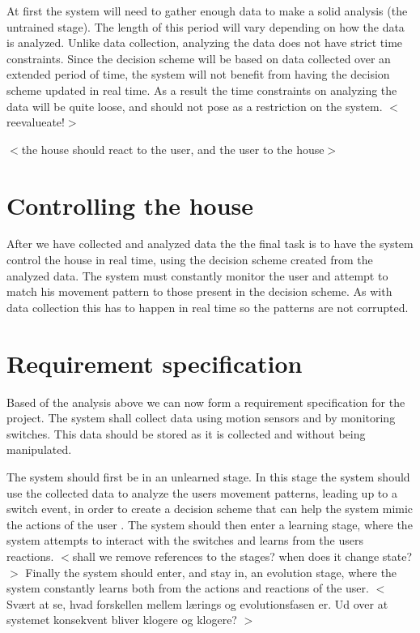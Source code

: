 At first the system will need to gather enough data to make a solid analysis (the untrained stage). The length of this period will vary depending on how the data is analyzed.
Unlike data collection, analyzing the data does not have strict time constraints. Since the decision scheme will be based on data collected over an extended period of time, the system will not benefit from having the decision scheme updated in real time. As a result the time constraints on analyzing the data will be quite loose, and should not pose as a restriction on the system.
$<$reevalueate!$>$

$<$the house should react to the user, and the user to the house$>$

\section{Controlling the house}
\label{controllingthehouse}

After we have collected and analyzed data the the final task is to have the system control the house in real time, using the decision scheme created from the analyzed data. The system must constantly monitor the user and attempt to match his movement pattern to those present in the decision scheme. As with data collection this has to happen in real time so the patterns are not corrupted.

\section{Requirement specification}
\label{requirementspecification}

Based of the analysis above we can now form a requirement specification for the project. The system shall collect data using motion sensors and by monitoring switches. This data should be stored as it is collected and without being manipulated. 

The system should first be in an unlearned stage. In this stage the system should use the collected data to analyze the users movement patterns, leading up to a switch event, in order to create a decision scheme that can help the system mimic the actions of the user . The system should then enter a learning stage, where the system attempts to interact with the switches and learns from the users reactions. $<$shall we remove references to the stages? when does it change state?$>$ Finally the system should enter, and stay in, an evolution stage, where the system constantly learns both from the actions and reactions of the user.
$<$Svært at se, hvad forskellen mellem lærings og evolutionsfasen er. Ud over at systemet konsekvent bliver klogere og klogere? $>$

